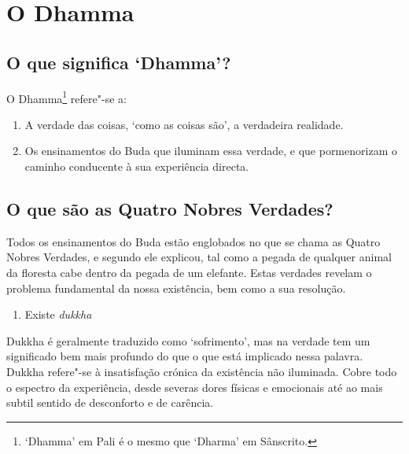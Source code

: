 

\setlength{\chapterTitleTopSkip}{10mm}


\chapter{O Dhamma}

\section{O que significa `Dhamma'?}

O Dhamma\footnote{`Dhamma' em Pali é o mesmo que `Dharma' em Sânscrito.}
refere"-se a:

\begin{enumerate}
\item
  A verdade das coisas, `como as coisas são', a verdadeira realidade.
\item
  Os ensinamentos do Buda que iluminam essa verdade, e que pormenorizam
  o caminho conducente à sua experiência directa.
\end{enumerate}

\section{O que são as Quatro Nobres Verdades?}

Todos os ensinamentos do Buda estão englobados no que se chama as Quatro
Nobres Verdades, e segundo ele explicou, tal como a pegada de qualquer
animal da floresta cabe dentro da pegada de um elefante. Estas verdades
revelam o problema fundamental da nossa existência, bem como a sua
resolução.

\begin{enumerate}[topsep=0pt]
\item Existe \emph{dukkha}
\end{enumerate}

Dukkha é geralmente traduzido como `sofrimento', mas na verdade tem um
significado bem mais profundo do que o que está implicado nessa palavra.
Dukkha refere"-se à insatisfação crónica da existência não iluminada.
Cobre todo o espectro da experiência, desde severas dores físicas e
emocionais até ao mais subtil sentido de desconforto e de carência.

